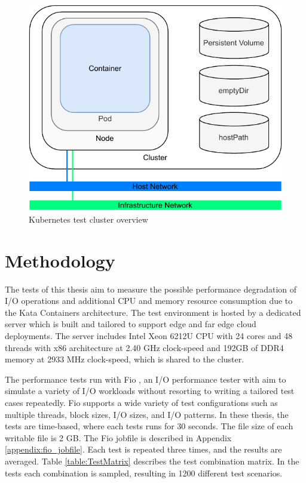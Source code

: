 \begin{figure}[ht]
  \begin{center}
    \includegraphics[width=12cm]{images/TestArchitectureClusterSimple.pdf}
    \caption{Kubernetes test cluster overview}
    \label{fig:TestArchitectureCluster}
  \end{center}
\end{figure}

\section{Methodology}

The tests of this thesis aim to measure the possible performance degradation of I/O operations and additional CPU and memory resource consumption due to the Kata Containers architecture. The test environment is hosted by a dedicated server which is built and tailored to support edge and far edge cloud deployments. The server includes Intel Xeon 6212U CPU with 24 cores and 48 threads with x86 architecture at 2.40 GHz clock-speed and 192GB of DDR4 memory at 2933 MHz clock-speed, which is shared to the cluster.

The performance tests run with Fio \cite{FIO}, an I/O performance tester with aim to simulate a variety of I/O workloads without resorting to writing a tailored test cases repeatedly. Fio supports a wide variety of test configurations such as multiple threads, block sizes, I/O sizes, and I/O patterns. In these thesis, the tests are time-based, where each tests runs for 30 seconds. The file size of each writable file is 2 GB. The Fio jobfile is described in Appendix \ref{appendix:fio_jobfile}. Each test is repeated three times, and the results are averaged. Table \ref{table:TestMatrix} describes the test combination matrix. In the tests each combination is sampled, resulting in 1200 different test scenarios. 

